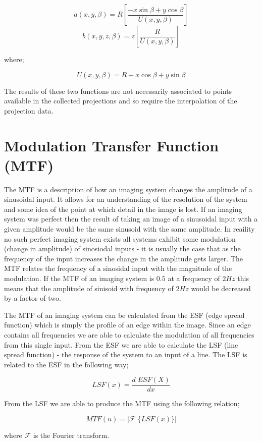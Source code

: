 \documentclass[
  twoside,
  11pt, a4paper,
  footinclude=true,
  headinclude=true,
  cleardoublepage=empty
]{scrbook}
\begin{document}
\[
a(x,y,\beta) = R[\frac{-x \sin \beta + y \cos \beta}{U(x,y,\beta)}]
\]
\[
b(x,y,z,\beta) = z[\frac{R}{U(x,y,\beta)}]
\]

where;

\[
U(x,y,\beta) = R + x \cos \beta + y \sin \beta
\]

The results of these two functions are not necessarily associated to points available in the collected projections and so require the interpolation of the projection data.


\section{Modulation Transfer Function (MTF)}

The MTF is a description of how an imaging system changes the amplitude of a sinusoidal input. It allows for an understanding of the resolution of the system and some idea of the point at which detail in the image is lost. If an imaging system was perfect then the result of taking an image of a sinusoidal input with a given amplitude would be the same sinusoid with the same amplitude. In reaility no such perfect imaging system exists all systems exhibit some modulation (change in amplitude) of sinosiodal inputs - it is usually the case that as the frequency of the input increases the change in the amplitude gets larger. The MTF relates the frequency of a sinosidal input with the magnitude of the modulation. If the MTF of an imaging system is $0.5$ at a frequency of $2Hz$ this means that the amplitude of sinisoid with frequency of $2Hz$ would be decreased by a factor of two.

The MTF of an imaging system can be calculated from the ESF (edge spread function) which is simply the profile of an edge within the image. Since an edge contains all frequencies we are able to calculate the modulation of all frequencies from this single input. From the ESF we are able to calculate the LSF (line spread function) - the response of the system to an input of a line. The LSF is related to the ESF in the following way;

\[
LSF(x) = \frac{d\;ESF(X)}{dx}
\]

From the LSF we are able to produce the MTF using the following relation;

\[
MTF(u) = |\mathcal{F}\;\{LSF(x)\}|
\]

where $\mathcal{F}$ is the Fourier transform.
\end{document}
